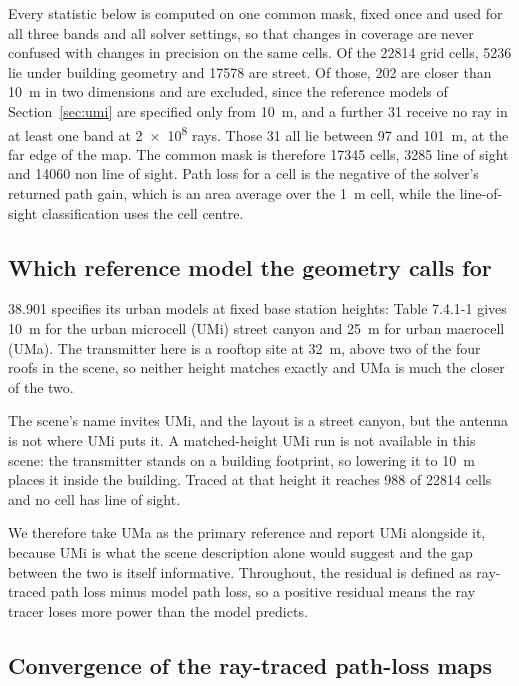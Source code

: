 \documentclass[conference]{IEEEtran}
\begin{document}
Every statistic below is computed on one common mask, fixed once and used for
all three bands and all solver settings, so that changes in coverage are never
confused with changes in precision on the same cells. Of the \num{22814} grid
cells, \num{5236} lie under building geometry and \num{17578} are street.
Of those, \num{202} are closer than \SI{10}{\metre} in two dimensions and are
excluded, since the reference models of Section~\ref{sec:umi} are specified
only from \SI{10}{\metre}, and a further \num{31} receive no ray in at least
one band at \num{2e8} rays. Those \num{31} all lie between \SI{97}{} and
\SI{101}{\metre}, at the far edge of the map. The common mask is therefore
\num{17345} cells, \num{3285} line of sight and \num{14060} non line of
sight. Path loss for a cell is the negative of the solver's returned path
gain, which is an area average over the \SI{1}{\metre} cell, while the
line-of-sight classification uses the cell centre.

\subsection{Which reference model the geometry calls for}

38.901 specifies its urban models at fixed base station heights: Table 7.4.1-1
gives \SI{10}{\metre} for the urban microcell (UMi) street canyon and
\SI{25}{\metre} for urban macrocell (UMa). The transmitter here is a rooftop
site at \SI{32}{\metre}, above two of the four roofs in the scene, so neither
height matches exactly and UMa is much the closer of the two.

The scene's name invites UMi, and the layout is a street canyon, but the
antenna is not where UMi puts it. A matched-height UMi run is not available in
this scene: the transmitter stands on a building footprint, so lowering it to
\SI{10}{\metre} places it inside the building. Traced at that height it
reaches \num{988} of \num{22814} cells and no cell has line of sight.

We therefore take UMa as the primary reference and report UMi alongside it,
because UMi is what the scene description alone would suggest and the gap
between the two is itself informative. Throughout, the residual is defined as
ray-traced path loss minus model path loss, so a positive residual means the
ray tracer loses more power than the model predicts.

\subsection{Convergence of the ray-traced path-loss maps}
\end{document}
